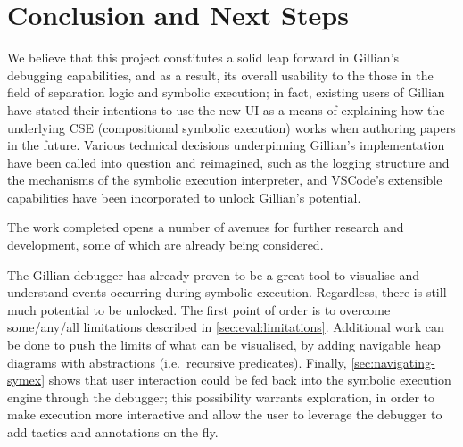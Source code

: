 
\chapter{Conclusion and Next Steps}\label{sec:conclusion}

We believe that this project constitutes a solid leap forward in Gillian's
debugging capabilities, and as a result, its overall usability to the those in
the field of separation logic and symbolic execution; in fact, existing users of
Gillian have stated their intentions to use the new UI as a means of explaining
how the underlying CSE (compositional symbolic execution) works when authoring
papers in the future. Various technical decisions underpinning Gillian's
implementation have been called into question and reimagined, such as the
logging structure and the mechanisms of the symbolic execution interpreter, and
VSCode's extensible capabilities have been incorporated to unlock Gillian's
potential.

The work completed opens a number of avenues for further research and
development, some of which are already being considered.




The Gillian debugger has already proven to be a great tool to visualise and
understand events occurring during symbolic execution. Regardless, there is
still much potential to be unlocked.
The first point of order is to overcome some/any/all limitations described in
\autoref{sec:eval:limitations}. Additional work can be done to push the limits
of what can be visualised, by adding navigable heap diagrams with abstractions
(i.e.\ recursive predicates). Finally, \autoref{sec:navigating-symex} shows that
user interaction could be fed back into the symbolic execution engine through
the debugger; this possibility warrants exploration, in order to make execution
more interactive and allow the user to leverage the debugger to add tactics and
annotations on the fly.

